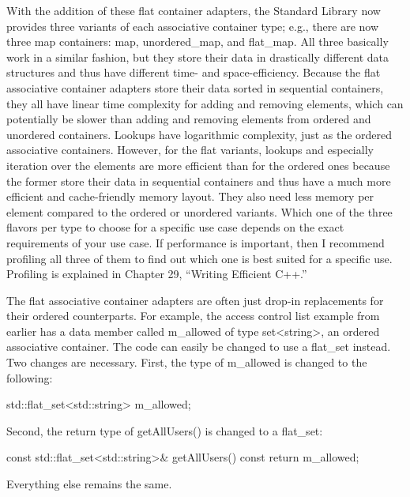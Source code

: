 With the addition of these flat container adapters, the Standard Library now provides three variants of each associative container type; e.g., there are now three map containers: map, unordered\_map, and flat\_map. All three basically work in a similar fashion, but they store their data in drastically different data structures and thus have different time- and space-efficiency. Because the flat associative container adapters store their data sorted in sequential containers, they all have linear time complexity for adding and removing elements, which can potentially be slower than adding and removing elements from ordered and unordered containers. Lookups have logarithmic complexity, just as the ordered associative containers. However, for the flat variants, lookups and especially iteration over the elements are more efficient than for the ordered ones because the former store their data in sequential containers and thus have a much more efficient and cache-friendly memory layout. They also need less memory per element compared to the ordered or unordered variants. Which one of the three flavors per type to choose for a specific use case depends on the exact requirements of your use case. If performance is important, then I recommend profiling all three of them to find out which one is best suited for a specific use. Profiling is explained in Chapter 29, “Writing Efficient C++.”

The flat associative container adapters are often just drop-in replacements for their ordered counterparts. For example, the access control list example from earlier has a data member called m\_allowed of type set<string>, an ordered associative container. The code can easily be changed to use a flat\_set instead. Two changes are necessary. First, the type of m\_allowed is changed to the following:

\begin{cpp}
std::flat_set<std::string> m_allowed;
\end{cpp}

Second, the return type of getAllUsers() is changed to a flat\_set:

\begin{cpp}
const std::flat_set<std::string>& getAllUsers() const { return m_allowed; }
\end{cpp}

Everything else remains the same.


